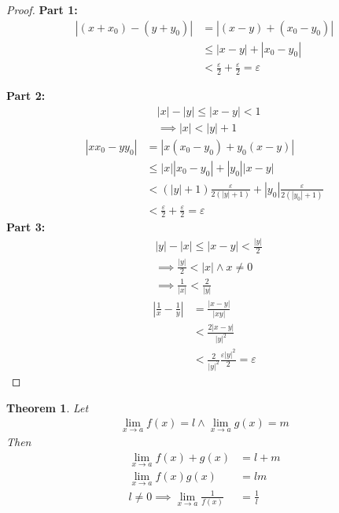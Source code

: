 \documentclass{article}
\theoremstyle{plain}
\newtheorem{theorem}{Theorem}
\theoremstyle{definition}
\begin{document}
\begin{proof}
\textbf{Part 1:}
\begin{align*}
        |(x+x_0)-(y+y_0)| &= |(x-y)+(x_0-y_0)| \\
                      &\leq |x-y|+|x_0-y_0| \\ &<
                      \frac{\varepsilon}{2}+\frac{\varepsilon}{2}
                      = \varepsilon
\end{align*}

\textbf{Part 2:}
\begin{align*}
    &|x| - |y| \leq |x-y| < 1  \\
    &\implies |x| < |y|+1 
\end{align*}
\begin{align*}
    |xx_0-yy_0| &= |x(x_0-y_0)+y_0(x-y)| \\
                &\leq |x||x_0-y_0| + |y_0||x-y| \\ 
				&< (|y|+1)\frac{\varepsilon}{2(|y|+1)} +
                |y_0|\frac{\varepsilon}{2(|y_0|+1)} \\ 
				&< \frac{\varepsilon}{2} + \frac{\varepsilon}{2} 
				= \varepsilon
\end{align*}
\textbf{Part 3:}
\begin{align*}
    &|y|-|x| \leq |x-y| < \frac{|y|}{2} \\
    &\implies \frac{|y|}{2} < |x| \land x \neq 0 \\
    &\implies \frac{1}{|x|} < \frac{2}{|y|}
\end{align*}
\begin{align}
    \left| \frac{1}{x} - 
	\frac{1}{y}\right| &= \frac{|x-y|}{|xy|} \\
                       &< \frac{2|x-y|}{|y|^2}\\
                       &< \frac{2}{|y|^2} \frac{\varepsilon |y|^2}{2}
					   = \varepsilon
\end{align}
\end{proof}
\begin{theorem}
Let
\begin{align*}
    \lim_{x \rightarrow a} f(x) = l \land \lim_{x \rightarrow a} g(x) = m
\end{align*}
Then
\begin{align*}
	\lim_{x \rightarrow a} f(x) + g(x) &= l + m \\
	\lim_{x \rightarrow a} f(x)g(x) &= lm \\
	l \neq 0 \implies \lim_{x \rightarrow a} \frac{1}{f(x)} &= \frac{1}{l} \\
\end{align*}
\end{theorem}
\end{document}
